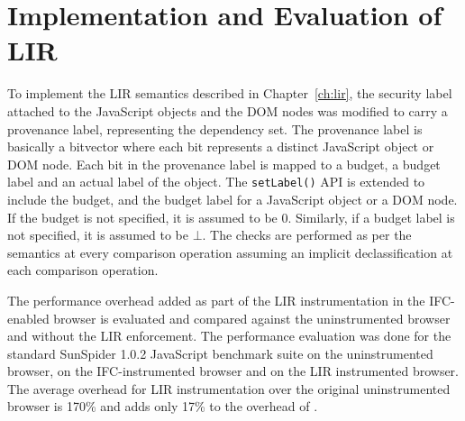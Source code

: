 \section{Implementation and Evaluation of LIR}
\label{sec:impllir}

To implement the LIR semantics described in Chapter~\ref{ch:lir}, the
security label attached to the JavaScript objects and the DOM nodes
was modified to carry a provenance label, representing the dependency
set. The provenance label is basically a bitvector where each bit
represents a distinct JavaScript object or DOM node. Each bit in the
provenance label is mapped to a budget, a budget label and an actual
label of the object. The \texttt{setLabel()} API is extended to
include the budget, and the budget label for a JavaScript object or a
DOM node. If the budget is not specified, it is assumed to be
$0$. Similarly, if a budget label is not specified, it is assumed to
be $\bot$. The checks are performed as per the semantics at every
comparison operation assuming an implicit declassification at 
each comparison operation.

The performance overhead added as part of the LIR instrumentation in
the IFC-enabled browser is evaluated and compared against the
uninstrumented browser and {\sys} without the LIR enforcement. 
The performance evaluation was done for the standard
SunSpider 1.0.2 JavaScript benchmark suite on the uninstrumented
browser, on the IFC-instrumented browser and on the LIR instrumented
browser. The average overhead for LIR instrumentation over the
original uninstrumented browser is 170\% and adds only 17\% to the
overhead of \sys.





